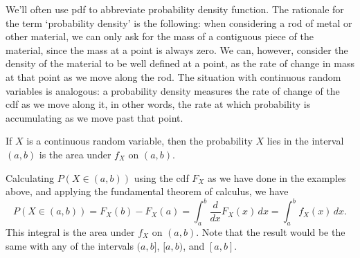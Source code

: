 We'll often use pdf to abbreviate probability density function. The rationale for the term `probability density' is the following: when considering a rod of metal or other material, we can only ask for the mass of a contiguous piece of the material, since the mass at a point is always zero. We can, however, consider the density of the material to be well defined at a point, as the rate of change in mass at that point as we move along the rod. The situation with continuous random variables is analogous: a probability density measures the rate of change of the cdf as we move along it, in other words, the rate at which probability is accumulating as we move past that point.
\par
\begin{prop}If $X$ is a continuous random variable, then the probability $X$ lies in the interval $(a,b)$ is the area under $f_X$ on $(a,b)$.
\end{prop}
\begin{pf} Calculating $P(X \in (a,b))$ using the cdf $F_X$ as we have done in the examples above, and applying the fundamental theorem of calculus, we have
$$P(X \in (a,b)) = F_X(b) - F_X(a) = \int_{a}^{b} \frac{d}{dx} F_X(x) \, dx = \int_{a}^{b} f_X(x) \, dx.$$
This integral is the area under $f_X$ on $(a,b)$. Note that the result would be the same with any of the intervals $(a,b]$, $[a,b)$, and $[a,b]$. \end{pf}

